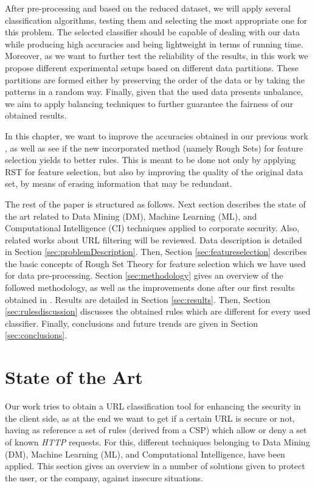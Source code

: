 \documentclass{llncs}
\begin{document}
After pre-processing and based on the reduced dataset, we will apply several classification algorithms, 
testing them and selecting the most appropriate one for this problem. The selected classifier should be capable 
of dealing with our data while producing high accuracies and
being lightweight in terms of running time. Moreover, as we want to further test the reliability of the results, 
in this work we propose different experimental setups based on different data
partitions. These partitions are formed either by preserving the order of the data or by taking the patterns in 
a random way. Finally, given that the used data presents unbalance, we aim to apply balancing 
techniques \cite{imbalance_techniques_02} to further guarantee the fairness of our obtained results.

In this chapter, we want to improve the accuracies obtained in our previous work \cite{ECTA}, 
as well as see if the new incorporated method (namely Rough Sets) for feature selection yields to better rules. 
This is meant to be done not only by applying RST for feature selection, but also by improving the quality of the 
original data set, by means of erasing information that may be redundant.

The rest of the paper is structured as follows. Next section describes the state of the art related 
to Data Mining (DM), Machine Learning (ML), and Computational Intelligence (CI) techniques applied 
to corporate security. Also, related works about URL filtering will be reviewed. Data  description is 
detailed in Section \ref{sec:problemDescription}. Then, Section \ref{sec:featureselection} describes the  
basic concepts of Rough Set Theory for feature selection which we  have used for data pre-processing. 
Section \ref{sec:methodology} gives an overview of the  followed methodology, as well as the improvements 
done after our  first results obtained in \cite{ECTA}. Results are detailed in Section \ref{sec:results}. 
Then, Section \ref{sec:rulesdiscussion}   discusses the  obtained rules which are different for every used 
classifier. Finally, conclusions and future trends are given in Section \ref{sec:conclusions}.
 
%
\section{State of the Art}
\label{sec:stateofart}

\noindent Our work tries to obtain a URL classification tool for
enhancing the security in the client side, as at the end we want to
get if a certain URL is secure or not, having as reference a set of
rules (derived from a CSP) which allow or deny a set of known
\textit{HTTP} requests. For this, different techniques belonging to
Data Mining (DM), Machine Learning (ML), and Computational
Intelligence, have been applied. This section gives  an overview in a
number of solutions given to protect the user, or the company, against
insecure situations.  %
\end{document}
